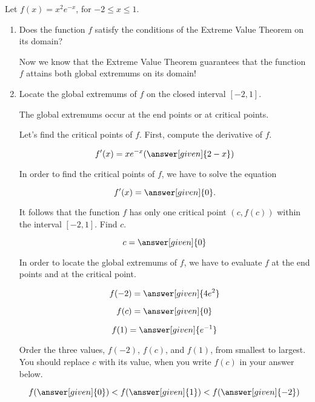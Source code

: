\documentclass{ximera}
\begin{document}
\begin{question}
Let $f(x)=x^2e^{-x}$, for $ -2\le x\le1$.
\begin{enumerate} 
\item Does the function $f$ satisfy
the conditions of the Extreme Value Theorem on its domain?
 \begin{multipleChoice}
 \end{multipleChoice}
Now we know that the Extreme Value Theorem guarantees that the function $f$
 attains both global extremums on its domain!
 \item Locate the global extremums
of $f$ on the closed interval $[-2,1]$.
\begin{explanation}

  The global extremums
 occur at the end points or at critical points.
  
Let's find the critical points of $f$. First, compute the derivative of $f$.
 \begin{prompt}
   \[
   f'(x)= xe^{-x}(\answer[given]{2-x})
   \]
 \end{prompt}
 In order to find the critical points of $f$, we have to solve the
 equation
 \begin{prompt}
   \[
   f'(x)= \answer[given]{0}.
   \]
 \end{prompt}
 It follows that the function $f$ has only one critical point
 $\left(c,f(c)\right)$ within the interval $[-2,1]$. Find $c$.
 \begin{prompt}
   \[
   c= \answer[given]{0}
   \]
 \end{prompt}
 In order to locate the global extremums of $f$, we have to evaluate
 $f$ at the end points and at the critical point.
 \begin{prompt}
   \[
   f(-2)= \answer[given]{4e^{2}}
   \]
 \end{prompt}
 \begin{prompt}
   \[
   f(c)= \answer[given]{0}
   \]
 \end{prompt}
 
 \begin{prompt}
   \[
   f(1)= \answer[given]{e^{-1}}
   \]
 \end{prompt}
 Order the three values, $f(-2)$, $f(c)$, and $f(1)$,  from smallest to largest. You should replace $c$ with its value, when you write $f(c)$  in your answer below.
 \begin{prompt}
  \[
  f(\answer[given]{0})<f(\answer[given]{1})<f(\answer[given]{-2})
  \]
  

\end{prompt}
\end{explanation}
\end{enumerate}
\end{question}
\end{document}
